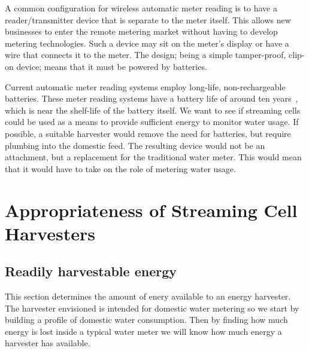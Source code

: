  A common configuration for wireless automatic meter reading is to have a reader/transmitter device that is separate to the meter itself.
  This allows new businesses to enter the remote metering market without having to develop metering technologies.
  Such a device may sit on the meter's display or have a wire that connects it to the meter.
  The design; being a simple tamper-proof, clip-on device; means that it must be powered by batteries.

  Current automatic meter reading systems employ long-life, non-rechargeable batteries.
  These meter reading systems have a battery life of around ten years~\cite{BMeters2014}, which is near the shelf-life of the battery itself.
  We want to see if streaming cells could be used as a means to provide sufficient energy to monitor water usage.
  If possible, a suitable harvester would remove the need for batteries, but require plumbing into the domestic feed.
  The resulting device would not be an attachment, but a replacement for the traditional water meter.
  This would mean that it would have to take on the role of metering water usage.


\section{Appropriateness of Streaming Cell Harvesters}


  \subsection{Readily harvestable energy}
    This section determines the amount of enery available to an energy harvester.
    The harvester envisioned is intended for domestic water metering so we start by building a profile of domestic water consumption.
    Then by finding how much energy is lost inside a typical water meter we will know how much energy a harvester has available.

